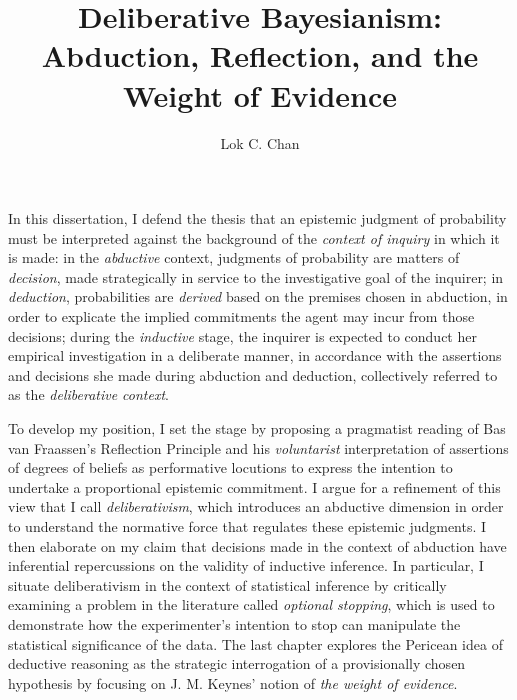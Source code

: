 \documentclass[PhD]{dukethesis2006}
\author{Lok C. Chan}
\title{Deliberative Bayesianism:\\Abduction, Reflection, and the Weight of Evidence}
\begin{document}
\maketitle

\makeabstract
\Copyright
\abstract
In this dissertation, I defend the thesis that an epistemic judgment of
probability must be interpreted against the background of the
\emph{context of inquiry} in which it is made: in the \emph{abductive} context,
judgments of probability are matters of \emph{decision}, made
strategically in service to the investigative goal of the inquirer; in
\emph{deduction}, probabilities are \emph{derived} based on the
premises chosen in abduction, in order to explicate the implied
commitments the agent may incur from those decisions; during the
\emph{inductive} stage, the inquirer is expected to conduct her empirical
investigation in a deliberate manner, in accordance with the assertions and
decisions she made during abduction and deduction, collectively referred
to as the \emph{deliberative context}.

To develop my position, I set the stage by proposing a pragmatist reading of Bas van Fraassen's Reflection Principle and his \emph{voluntarist} interpretation of assertions of degrees of beliefs as performative locutions to express the intention to undertake a proportional epistemic commitment. I argue for a refinement of this view that I call \emph{deliberativism}, which introduces an abductive dimension in order to understand the normative force that regulates these epistemic judgments. I then elaborate on my claim that decisions made in the context of abduction have inferential repercussions on the validity of inductive inference. In particular, I situate deliberativism in the context of statistical inference by critically examining a problem in the literature called \emph{optional stopping}, which is used to demonstrate how the experimenter's intention to stop can manipulate the statistical significance of the data. The last chapter explores the Pericean idea of deductive reasoning as the strategic interrogation of a provisionally chosen hypothesis by focusing on J. M. Keynes' notion of \emph{the weight of evidence}.


\singlespacing
\tableofcontents
\listoffigures
\listoftables
\doublespacing








\printbibliography[heading=bibintoc]
\end{document}
